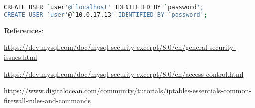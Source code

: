 \begin{lstlisting}[language=bash,frame=single,showstringspaces=false]
CREATE USER `user'@`localhost' IDENTIFIED BY `password';
CREATE USER `user'@`10.0.17.13' IDENTIFIED BY `password';
\end{lstlisting}

\noindent
\textbf{References}:

    \url{https://dev.mysql.com/doc/mysql-security-excerpt/8.0/en/general-security-issues.html}
    
    \url{https://dev.mysql.com/doc/mysql-security-excerpt/8.0/en/access-control.html}
    
    \url{https://www.digitalocean.com/community/tutorials/iptables-essentials-common-firewall-rules-and-commands}
\noindent